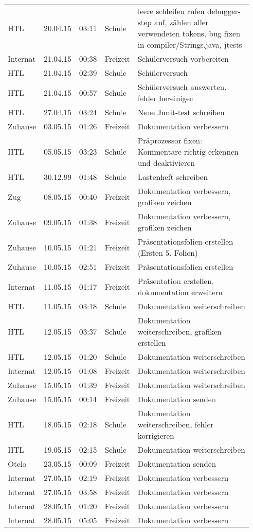 \begin{small}
\begin{longtable}{ p{} p{} p{} p{} p{}}
HTL	& 20.04.15	& 03:11	& Schule	& leere schleifen rufen debugger-step auf, z\"ahlen aller verwendeten tokens, bug fixen in compiler/Strings.java, jtests \\
Internat	& 21.04.15	& 00:38	& Freizeit	& Sch\"ulerversuch vorbereiten \\
HTL	& 21.04.15	& 02:39	& Schule	& Sch\"ulerversuch \\
HTL	& 21.04.15	& 00:57	& Schule	& Sch\"ulerversuch auswerten, fehler bereinigen \\
HTL	& 27.04.15	& 03:24	& Schule	& Neue Junit-test schreiben \\
Zuhause	& 03.05.15	& 01:26	& Freizeit	& Dokumentation verbessern \\
HTL	& 05.05.15	& 03:23	& Schule	& Pr\"aprozessor fixen: Kommentare richtig erkennen und deaktivieren \\
HTL	& 30.12.99	& 01:48	& Schule	& Lastenheft schreiben \\
Zug	& 08.05.15	& 00:40	& Freizeit	& Dokumentation verbessern, grafiken zeichen \\
Zuhause	& 09.05.15	& 01:38	& Freizeit	& Dokumentation verbessern, grafiken zeichen \\
Zuhause	& 10.05.15	& 01:21	& Freizeit	& Pr\"asentationsfolien erstellen (Ersten 5. Folien) \\
Zuhause	& 10.05.15	& 02:51	& Freizeit	& Pr\"asentationsfolien erstellen \\
Internat	& 11.05.15	& 01:17	& Freizeit	& Pr\"asentation erstellen, dokumentation erweitern \\
HTL	& 11.05.15	& 03:18	& Schule	& Dokumentation weiterschreiben \\
HTL	& 12.05.15	& 03:37	& Schule	& Dokumentation weiterschreiben, grafiken erstellen \\
HTL	& 12.05.15	& 01:20	& Schule	& Dokumentation weiterschreiben \\
Internat	& 12.05.15	& 01:08	& Freizeit	& Dokumentation weiterschreiben \\
Zuhause	& 15.05.15	& 01:39	& Freizeit	& Dokumentation weiterschreiben \\
Zuhause	& 15.05.15	& 00:14	& Freizeit	& Dokumentation senden \\
HTL	& 18.05.15	& 02:18	& Schule	& Dokumentation weiterschreiben, fehler korrigieren \\
HTL	& 19.05.15	& 02:15	& Schule	& Dokumentation weiterschreiben \\
Otelo	& 23.05.15	& 00:09	& Freizeit	& Dokumentation senden \\
Internat	& 27.05.15	& 02:19	& Freizeit	& Dokumentation verbessern \\
Internat	& 27.05.15	& 03:58	& Freizeit	& Dokumentation verbessern \\
Internat	& 28.05.15	& 01:20	& Freizeit	& Dokumentation verbessern \\
Internat	& 28.05.15	& 05:05	& Freizeit	& Dokumentation verbessern \\

 \end{longtable}
\end{small}


